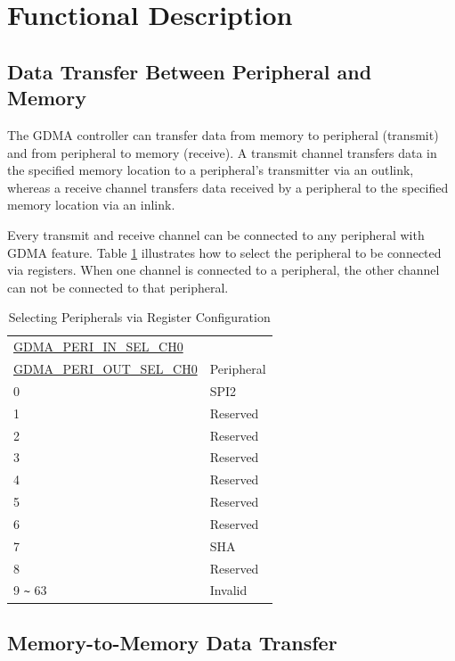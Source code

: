 \documentclass[main\_\_EN.tex]{subfiles}
\begin{document}
\section{Functional Description}

\subsection{Data Transfer Between Peripheral and Memory}

The GDMA controller can transfer data from memory to peripheral (transmit) and from peripheral to memory (receive). A transmit channel transfers data in the specified memory location to a peripheral's transmitter via an outlink, whereas a receive channel transfers data received by a peripheral to the specified memory location via an inlink.

Every transmit and receive channel can be connected to any peripheral with GDMA feature. Table \ref{tab:gdma-peri-sel} illustrates how to select the peripheral to be connected via registers. When one channel is connected to a peripheral, the other channel can not be connected to that peripheral.

\clearpage
\begin{longtable}[c]{|l|p{3cm}|}
\caption{Selecting Peripherals via Register Configuration}
\label{tab:gdma-peri-sel}\\\hline
    \rowcolor{lightgray}
    \hyperref[fielddesc:GDMAPERIINSELCH0]{GDMA\_PERI\_IN\_SEL\_CH0} & \\
    \rowcolor{lightgray}
    \hyperref[fielddesc:GDMAPERIOUTSELCH0]{GDMA\_PERI\_OUT\_SEL\_CH0} & \multirow{-2}{*}{Peripheral}\\
    \hline
    0   & SPI2 \\ \hline
    1   & Reserved \\ \hline
    2   & Reserved  \\ \hline
    3   & Reserved  \\ \hline
    4   & Reserved \\ \hline
    5   & Reserved  \\ \hline
    6   & Reserved  \\ \hline
    7   & SHA \\ \hline
    8   & Reserved   \\ \hline
    9 \verb+~+ 63 & Invalid
\end{longtable}

\subsection{Memory-to-Memory Data Transfer}
\end{document}
